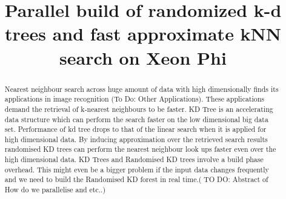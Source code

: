 \documentclass[letterpaper]{article}
\title{Parallel build of randomized k-d trees and fast approximate kNN search on Xeon Phi}
\begin{document}
\maketitle

\begin{abstract}
    Nearest neighbour search across huge amount of data with high dimensionally finds its applications in image recognition (To Do: Other Applications). These applications demand the retrieval of k-nearest neighbours to be faster. KD Tree is an accelerating data structure which can perform the search faster on the low dimensional big data set. Performance of kd tree drops to that of the linear search when it is applied for high dimensional data. By inducing approximation over the retrieved search results randomised KD trees can perform the nearest neighbour look ups faster even over the high dimensional data. KD Trees and Randomised KD trees involve a build phase overhead. This might even be a bigger problem if the input data changes frequently and we need to build the Randomised KD forest in real time.( TO DO: Abstract of How do we parallelise and etc..)
\end{abstract}






% 



\end{document}
